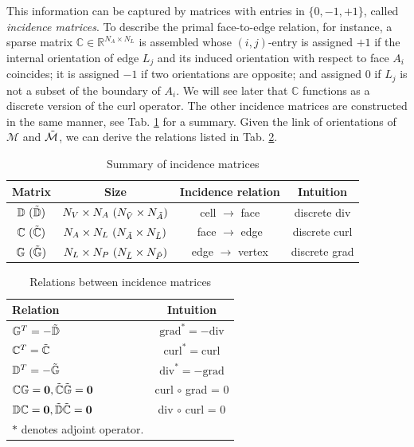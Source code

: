 \documentclass{article}
\begin{document}
This information can be captured by matrices with entries in $\{0,-1,+1\}$, called \emph{incidence matrices}. To describe the primal face-to-edge relation, for instance, a sparse matrix $\mathbb{C} \in \mathbb{R}^{N_A \times N_L}$ is assembled whose $(i,j)$-entry is assigned $+1$ if the internal orientation of edge $L_j$ and its induced orientation with respect to face $A_i$ coincides; it is assigned $-1$ if two orientations are opposite; and assigned $0$ if $L_j$ is not a subset of the boundary of $A_i$. We will see later that $\mathbb{C}$ functions as a discrete version of the curl operator. The other incidence matrices are constructed in the same manner, see Tab. \ref{tab:incidence_mat} for a summary. Given the link of orientations of $\mathcal{M}$ and $\Tilde{\mathcal{M}}$, we can derive the relations listed in Tab. \ref{tab:incidence_relation}.  

\begin{table}[h!]
    \centering
    \begin{tabular}{c c c c}
    \hline
         Matrix & Size & Incidence relation & Intuition  \\
    \hline
         $\mathbb{D}\ (\Tilde{\mathbb{D}})$ & $N_V \times N_A\ (N_{\Tilde{V}} \times N_{\Tilde{A}})$ & cell $\rightarrow$ face & discrete div \\
         $\mathbb{C}\ (\Tilde{\mathbb{C}})$ & $N_A \times N_L\ (N_{\Tilde{A}} \times N_{\Tilde{L}})$ & face $\rightarrow$ edge & discrete curl \\
         $\mathbb{G}\ (\Tilde{\mathbb{G}})$ & $N_L \times N_P\ (N_{\Tilde{L}} \times N_{\Tilde{P}})$ & edge $\rightarrow$ vertex & discrete grad \\
    \hline
    \end{tabular}
    \caption{Summary of incidence matrices}
    \label{tab:incidence_mat}
\end{table}

\begin{table}[h!]
    \centering
    \begin{tabular}{l c}
    \hline
         Relation & Intuition \\
    \hline
         $\mathbb{G}^T = -\Tilde{\mathbb{D}}$  &  $\text{grad}^* = - \text{div}$\\
         $\mathbb{C}^T = \Tilde{\mathbb{C}}$   &  $\text{curl}^* = \text{curl}$\\
         $\mathbb{D}^T = -\Tilde{\mathbb{G}}$  &  $\text{div}^* = - \text{grad}$\\
         $\mathbb{C}\mathbb{G} = \mathbf{0}, \Tilde{\mathbb{C}}\Tilde{\mathbb{G}} = \mathbf{0}$  &  curl $\circ$ grad = 0 \\
         $\mathbb{D}\mathbb{C} = \mathbf{0}, \Tilde{\mathbb{D}}\Tilde{\mathbb{C}} = \mathbf{0}$   &  div $\circ$ curl = 0 \\
    \hline
        \small $\ast$ denotes adjoint operator.
    \end{tabular}
    \caption{Relations between incidence matrices}
    \label{tab:incidence_relation}
\end{table}
\end{document}
